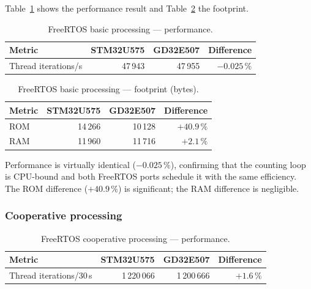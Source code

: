 Table~\ref{tab:gd32-freertos-basic-perf} shows the performance result and
Table~\ref{tab:gd32-freertos-basic-fp} the footprint.

\begin{table}[H]
  \centering
  \caption{FreeRTOS basic processing --- performance.}
  \label{tab:gd32-freertos-basic-perf}
  \begin{tabular}{l r r r}
    \toprule
    \textbf{Metric} & \textbf{STM32U575} & \textbf{GD32E507} & \textbf{Difference} \\
    \midrule
    Thread iterations/s & 47\,943 & 47\,955 & $-0.025\,\%$ \\
    \bottomrule
  \end{tabular}
\end{table}

\begin{table}[H]
  \centering
  \caption{FreeRTOS basic processing --- footprint (bytes).}
  \label{tab:gd32-freertos-basic-fp}
  \begin{tabular}{l r r r}
    \toprule
    \textbf{Metric} & \textbf{STM32U575} & \textbf{GD32E507} & \textbf{Difference} \\
    \midrule
    ROM & 14\,266 & 10\,128 & $+40.9\,\%$ \\
    RAM & 11\,960 & 11\,716 & $+2.1\,\%$ \\
    \bottomrule
  \end{tabular}
\end{table}

Performance is virtually identical ($-0.025\,\%$), confirming that the counting loop is
CPU-bound and both FreeRTOS ports schedule it with the same efficiency. The ROM difference
($+40.9\,\%$) is significant; the RAM difference is negligible.

\subsubsection{Cooperative processing}
\label{sec:gd32-freertos-coop}

\begin{table}[H]
  \centering
  \caption{FreeRTOS cooperative processing --- performance.}
  \label{tab:gd32-freertos-coop-perf}
  \begin{tabular}{l r r r}
    \toprule
    \textbf{Metric} & \textbf{STM32U575} & \textbf{GD32E507} & \textbf{Difference} \\
    \midrule
    Thread iterations/30\,s & 1\,220\,066 & 1\,200\,666 & $+1.6\,\%$ \\
    \bottomrule
  \end{tabular}
\end{table}

